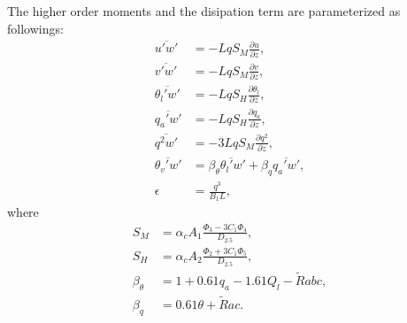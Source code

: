 The higher order moments and the disipation term are parameterized as followings:
\begin{align}
  \overline{u'w'} &= -LqS_M\frac{\partial u}{\partial z}, \\
  \overline{v'w'} &= -LqS_M\frac{\partial v}{\partial z}, \\
  \overline{\theta_l'w'} &= -LqS_H\frac{\partial \theta_l}{\partial z}, \\
  \overline{q_a'w'} &= -LqS_H\frac{\partial q_a}{\partial z}, \\
  \overline{q^2w'} &= -3LqS_M\frac{\partial q^2}{\partial z}, \\
  \overline{\theta_v' w'} &= \beta_\theta\overline{\theta_l'w}'+\beta_q\overline{q_a'w'}, \\
  \epsilon &= \frac{q^3}{B_1L},
\end{align}
where
\begin{align}
  S_M &= \alpha_cA_1\frac{\Phi_3-3C_1\Phi_4}{D_{2.5}}, \\
  S_H &= \alpha_cA_2\frac{\Phi_2+3C_1\Phi_5}{D_{2.5}}, \\
  \beta_\theta &= 1 + 0.61 q_a - 1.61 Q_l - \tilde{R} abc, \\
  \beta_q &= 0.61\theta + \tilde{R} ac.
\end{align}

